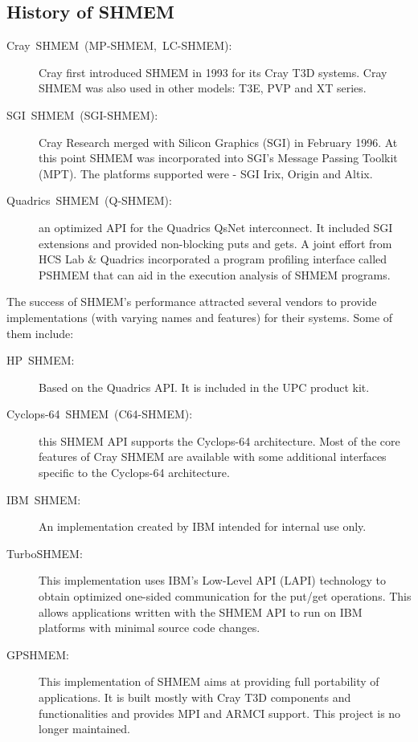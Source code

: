 \subsection{History of SHMEM}
\begin{description}
\item [{{Cray~SHMEM~(MP-SHMEM,~LC-SHMEM):}}] Cray first introduced
SHMEM in 1993 for its Cray T3D systems. Cray SHMEM was also used in
other models: T3E, PVP and XT series. 
\item [{{SGI~SHMEM~(SGI-SHMEM):}}] Cray Research merged with Silicon
Graphics (SGI) in February 1996. At this point SHMEM was incorporated
into SGI's Message Passing Toolkit (MPT). The platforms supported
were - SGI Irix, Origin and Altix. 
\item [{{Quadrics~SHMEM~(Q-SHMEM):}}] an optimized API for the Quadrics
QsNet interconnect. It included SGI extensions and provided non-blocking
puts and gets. A joint effort from HCS Lab \& Quadrics incorporated
a program profiling interface called PSHMEM that can aid in the execution
analysis of SHMEM programs. 
\end{description}
The success of SHMEM's performance attracted several vendors to provide
implementations (with varying names and features) for their systems.
Some of them include: 
\begin{description}
\item [{{HP~SHMEM:}}] Based on the Quadrics API. It is included in the
UPC product kit. 
\item [{{Cyclops-64~SHMEM~(C64-SHMEM):}}] this SHMEM API supports the
Cyclops-64 architecture. Most of the core features of Cray SHMEM are
available with some additional interfaces specific to the Cyclops-64
architecture. %

\item [{{IBM~SHMEM:}}] An implementation created by IBM intended for
internal use only. 
\item [{{TurboSHMEM:}}] This implementation uses IBM's Low-Level API
(LAPI) technology to obtain optimized one-sided communication for
the put/get operations. This allows applications written with the
SHMEM API to run on IBM platforms with minimal source code changes. 
\item [{{GPSHMEM:}}] This implementation of SHMEM aims at providing full
portability of applications. It is built mostly with Cray T3D components
and functionalities and provides MPI and ARMCI support. This project
is no longer maintained. \end{description}
